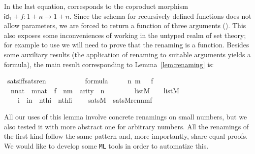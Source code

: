 In the last equation,  corresponds to
the coproduct morphism $\mathsf{id}_{1}+f \colon 1 + n \to 1 +
n$. Since the schema for recursively defined functions does not allow
parameters, we are forced to return a function of three arguments
(). This also exposes some inconveniences of working in the
untyped realm of set theory; for example to use  we will need
to prove that the renaming is a function. Besides some auxiliary
results (the application of renaming to suitable arguments yields a
formula), the main result corresponding to Lemma~\ref{lem:renaming}
is:
\begin{isabelle}
\isamarkupfalse%
\ sats{\isacharunderscore}iff{\isacharunderscore}sats{\isacharunderscore}ren\ {\isacharcolon}\ \isanewline
\ \ \ {\isasymphi}\isanewline
\ \ \ {\isachardoublequoteopen}{\isasymphi}\ {\isasymin}\ formula{\isachardoublequoteclose}\isanewline
\ \ \ \ {\isachardoublequoteopen}{\isasymAnd}\ n\ m\ {\isasymrho}\ {\isasymrho}{\isacharprime}\ f\ {\isachardot}\ \isanewline
\ \ {\isasymlbrakk}n{\isasymin}nat\ {\isacharsemicolon}\ m{\isasymin}nat\ {\isacharsemicolon}\ f\ {\isasymin}\ n{\isasymrightarrow}m\ {\isacharsemicolon}\ arity{\isacharparenleft}{\isasymphi}{\isacharparenright}\ {\isasymle}\ n\ {\isacharsemicolon}\isanewline
\ \ \ \ \ {\isasymrho}\ {\isasymin}\ list{\isacharparenleft}M{\isacharparenright}\ {\isacharsemicolon}\ {\isasymrho}{\isacharprime}\ {\isasymin}\ list{\isacharparenleft}M{\isacharparenright}\ {\isacharsemicolon}\ \isanewline
\ \ \ {\isasymAnd}\ i\ {\isachardot}\ i{\isacharless}n\ {\isasymLongrightarrow}\ nth{\isacharparenleft}i{\isacharcomma}{\isasymrho}{\isacharparenright}\ {\isacharequal}\ nth{\isacharparenleft}f{\isacharbackquote}i{\isacharcomma}{\isasymrho}{\isacharprime}{\isacharparenright}\ {\isasymrbrakk}\ {\isasymLongrightarrow}\isanewline
\ \ sats{\isacharparenleft}M{\isacharcomma}{\isasymphi}{\isacharcomma}{\isasymrho}{\isacharparenright}\ {\isasymlongleftrightarrow}\ sats{\isacharparenleft}M{\isacharcomma}ren{\isacharparenleft}{\isasymphi}{\isacharparenright}{\isacharbackquote}n{\isacharbackquote}m{\isacharbackquote}f{\isacharcomma}{\isasymrho}{\isacharprime}{\isacharparenright}{\isachardoublequoteclose}\end{isabelle}

All our uses of this lemma involve concrete renamings on small
numbers, but we also tested it with more abstract one for
arbitrary numbers. All the renamings of the first kind follow the
same pattern and, more importantly, share equal proofs. We would like
to develop some \texttt{ML} tools in order to automatize this.


